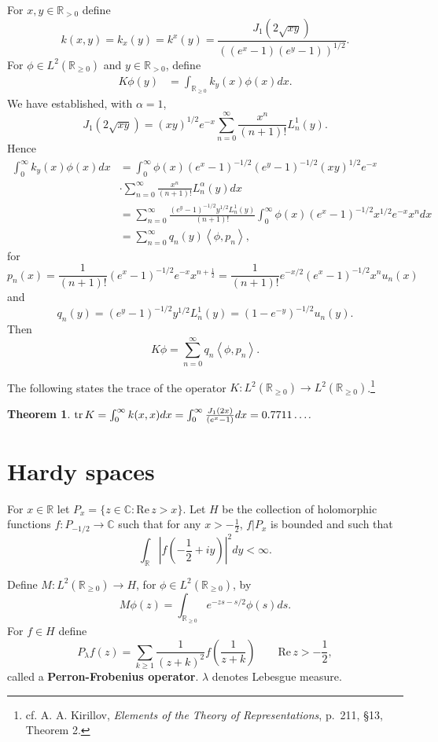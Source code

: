 \documentclass{article}
\newcommand{\inner}[2]{\left\langle #1, #2 \right\rangle}
\newcommand{\tr}{\ensuremath\mathrm{tr}\,}
\def\Re{\ensuremath{\mathrm{Re}}\,}
\newtheorem{theorem}{Theorem}
\theoremstyle{definition}
\begin{document}
For $x,y \in \mathbb{R}_{> 0}$ define
\[
k(x,y)= k_x(y) = k^x(y) = \frac{J_1(2 \sqrt{xy})}{((e^x-1)(e^y-1))^{1/2}}.
\]
For $\phi \in L^2(\mathbb{R}_{\geq 0})$ and $y \in \mathbb{R}_{> 0}$, define
\begin{align*}
K\phi(y) &= \int_{\mathbb{R}_{\geq 0}} k_y(x) \phi(x) dx.
\end{align*}
We have established, with $\alpha=1$,
\[
J_1(2\sqrt{xy}) = (xy)^{1/2} e^{-x} \sum_{n=0}^\infty \frac{x^n}{(n+1)!} L_n^1(y).
\]
Hence
\begin{align*}
\int_0^\infty k_y(x) \phi(x) dx&=\int_0^\infty \phi(x) (e^x-1)^{-1/2} (e^y-1)^{-1/2} (xy)^{1/2}
e^{-x}\\
&\cdot \sum_{n=0}^\infty \frac{x^n}{(n+1)!} L_n^\alpha(y) dx\\
&=\sum_{n=0}^\infty \frac{(e^y-1)^{-1/2} y^{1/2} L_n^1(y)}{(n+1)!} \int_0^\infty \phi(x) (e^x-1)^{-1/2}
x^{1/2} e^{-x} x^n dx\\
&=\sum_{n=0}^\infty q_n(y)  \inner{\phi}{p_n},
\end{align*}
for
\[
p_n(x)=\frac{1}{(n+1)!} (e^x-1)^{-1/2} e^{-x} x^{n+\frac{1}{2}}
=\frac{1}{(n+1)!} e^{-x/2} (e^x-1)^{-1/2} x^n u_n(x)
\]
and
\[
q_n(y)=(e^y-1)^{-1/2} y^{1/2} L_n^1(y) = (1-e^{-y})^{-1/2} u_n(y).
\]
Then
\[
K\phi = \sum_{n=0}^\infty q_n \inner{\phi}{p_n}.
\]



The following states the trace of the operator $K:L^2(\mathbb{R}_{\geq 0}) \to L^2(\mathbb{R}_{\geq 0})$.\footnote{cf.
A. A. Kirillov, {\em Elements of the Theory of Representations},
p.~211, \S 13, Theorem 2.}



\begin{theorem}
$\tr K=\int_0^\infty k(x,x) dx=\int_0^\infty \frac{J_1(2x)}{(e^x-1)} dx=0.7711\ldots$.
\end{theorem}







\section{Hardy spaces}
For $x \in \mathbb{R}$ let $P_x=\{z \in \mathbb{C}: \Re z > x\}$.
Let $H$ be the collection of holomorphic functions $f:P_{-1/2} \to \mathbb{C}$ such that for
any $x>-\frac{1}{2}$, $f|P_x$ is bounded and such that
\[
\int_{\mathbb{R}} \left| f\left( -\frac{1}{2}+iy\right) \right|^2 dy<\infty.
\]


Define $M:L^2(\mathbb{R}_{\geq 0}) \to H$, for $\phi \in L^2(\mathbb{R}_{\geq 0})$, by
\[
M\phi(z) = \int_{\mathbb{R}_{\geq 0}} e^{-zs -s/2} \phi(s) ds.
\]
For $f \in H$ define
\[
P_\lambda f(z) = \sum_{k \geq 1} \frac{1}{(z+k)^2} f \left( \frac{1}{z+k} \right)\qquad \Re z > -\frac{1}{2},
\]
called a \textbf{Perron-Frobenius operator}.
$\lambda$ denotes Lebesgue measure. 
\end{document}
